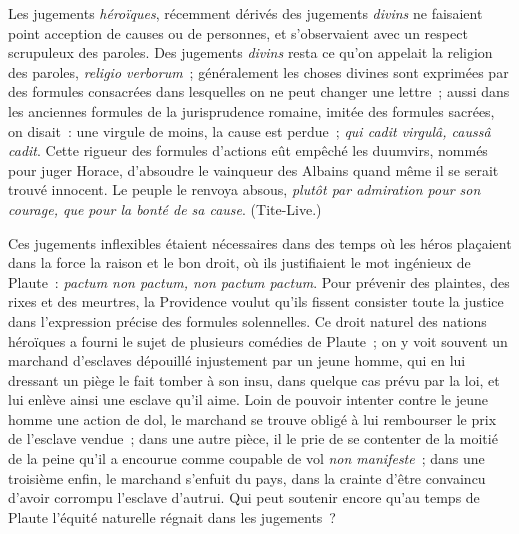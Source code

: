\documentclass[french,twoside]{book} %
\begin{document}
Les jugements {\itshape héroïques}, récemment dérivés des jugements {\itshape divins} ne faisaient point acception de causes ou de personnes, et s’observaient avec un respect scrupuleux des paroles. Des jugements {\itshape divins} resta ce qu’on appelait la religion des paroles, {\itshape religio verborum} ; généralement les choses divines sont exprimées par des formules consacrées dans lesquelles on ne peut changer une lettre ; aussi dans les anciennes formules de la jurisprudence romaine, imitée des formules sacrées, on disait : une virgule de moins, la cause est perdue ; {\itshape qui cadit virgulâ, caussâ cadit}. Cette rigueur des formules d’actions eût empêché les duumvirs, nommés pour juger Horace, d’absoudre le vainqueur des Albains quand même il se serait trouvé innocent. Le peuple le renvoya absous, \emph{{\itshape plutôt par admiration pour son courage, que pour la bonté de sa cause}}. (Tite-Live.)\par
Ces jugements inflexibles étaient nécessaires dans des temps où les héros plaçaient dans la force la raison et le bon droit, où ils justifiaient le mot ingénieux de Plaute : \emph{{\itshape pactum non pactum, non pactum pactum}}. Pour prévenir des plaintes, des rixes et des meurtres, la Providence voulut qu’ils fissent consister toute la justice dans l’expression précise des formules solennelles. Ce droit naturel des nations héroïques a fourni le sujet de plusieurs comédies de Plaute ; on y voit souvent un marchand  d’esclaves dépouillé injustement par un jeune homme, qui en lui dressant un piège le fait tomber à son insu, dans quelque cas prévu par la loi, et lui enlève ainsi une esclave qu’il aime. Loin de pouvoir intenter contre le jeune homme une action de dol, le marchand se trouve obligé à lui rembourser le prix de l’esclave vendue ; dans une autre pièce, il le prie de se contenter de la moitié de la peine qu’il a encourue comme coupable de vol {\itshape non manifeste} ; dans une troisième enfin, le marchand s’enfuit du pays, dans la crainte d’être convaincu d’avoir corrompu l’esclave d’autrui. Qui peut soutenir encore qu’au temps de Plaute l’équité naturelle régnait dans les jugements ?\par
\end{document}
